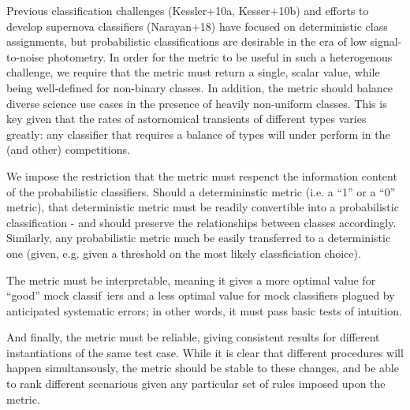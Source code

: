 Previous classification challenges (Kessler+10a, Kesser+10b) and efforts to develop supernova classifiers (Narayan+18) have focused on deterministic class assignments, but probabilistic classifications are desirable in the era of low signal-to-noise photometry. In order for the metric to be useful in such a heterogenous challenge, we require that the metric must return a single, scalar value, while being well-defined for non-binary classes.
In addition, the metric should balance diverse science use cases in the presence of heavily non-uniform classes. This is key given that the rates of astornomical transients of different types varies greatly: any classifier that requires a balance of types will under perform in the \plasticc (and other) competitions.

We impose the restriction that the metric must respenct the information content of the probabilistic classifiers. Should a determininstic metric (i.e. a ``1'' or a ``0'' metric), that deterministic metric must be readily convertible into a probabilistic classification - and should preserve the relationships between classes accordingly. Similarly, any probabilistic metric much be easily transferred to a deterministic one (given, e.g. given a threshold on the most likely classficiation choice).

The metric must be interpretable, meaning it gives a more optimal value for ``good'' mock classif\
iers and a less optimal value for mock classifiers plagued by anticipated systematic errors; in other words, it must pass basic tests of intuition.

And finally, the metric must be reliable, giving consistent results for different instantiations of the same test case. While it is clear that different procedures will happen simultansously, the metric should be stable to these changes, and be able to rank different scenarious given any particular set of rules imposed upon the metric.



